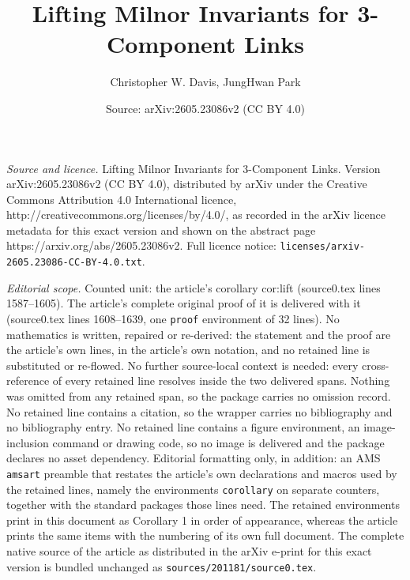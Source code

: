 \documentclass[10pt,a4paper]{amsart}
\title{Lifting Milnor Invariants for 3-Component Links}
\author{Christopher W. Davis, JungHwan Park}
\date{Source: arXiv:2605.23086v2 (CC BY 4.0)}
\begin{document}
\maketitle

\noindent\emph{Source and licence.} Lifting Milnor Invariants for 3-Component Links. Version arXiv:2605.23086v2 (CC BY 4.0), distributed by arXiv under the Creative Commons Attribution 4.0 International licence, http://creativecommons.org/licenses/by/4.0/, as recorded in the arXiv licence metadata for this exact version and shown on the abstract page https://arxiv.org/abs/2605.23086v2. Full licence notice: \texttt{licenses/arxiv-2605.23086-CC-BY-4.0.txt}.\par\smallskip

\noindent\textit{Editorial scope.} Counted unit: the article's corollary cor:lift (source0.tex lines 1587--1605). The article's complete original proof of it is delivered with it (source0.tex lines 1608--1639, one \texttt{proof} environment of 32 lines). No mathematics is written, repaired or re-derived: the statement and the proof are the article's own lines, in the article's own notation, and no retained line is substituted or re-flowed.  No further source-local context is needed: every cross-reference of every retained line resolves inside the two delivered spans.  Nothing was omitted from any retained span, so the package carries no omission record.  No retained line contains a citation, so the wrapper carries no bibliography and no bibliography entry.  No retained line contains a figure environment, an image-inclusion command or drawing code, so no image is delivered and the package declares no asset dependency.  Editorial formatting only, in addition: an AMS \texttt{amsart} preamble that restates the article's own declarations and macros used by the retained lines, namely the environments \texttt{corollary} on separate counters, together with the standard packages those lines need.  The retained environments print in this document as Corollary 1 in order of appearance, whereas the article prints the same items with the numbering of its own full document.  The complete native source of the article as distributed in the arXiv e-print for this exact version is bundled unchanged as \texttt{sources/201181/source0.tex}.
\end{document}
